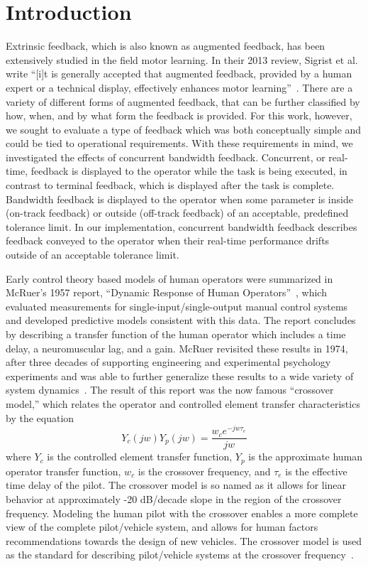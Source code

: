 \section{Introduction}
Extrinsic feedback, which is also known as augmented feedback, has been extensively studied in the field motor learning.
In their 2013 review, Sigrist et al. write ``[i]t is generally accepted that augmented feedback, provided by a human expert or a technical display, effectively enhances motor learning''~\cite{sigrist_augmented_2013}.
There are a variety of different forms of augmented feedback, that can be further classified by how, when, and by what form the feedback is provided.
For this work, however, we sought to evaluate a type of feedback which was both conceptually simple and could be tied to operational requirements.
With these requirements in mind, we investigated the effects of concurrent bandwidth feedback.
Concurrent, or real-time, feedback is displayed to the operator while the task is being executed, in contrast to terminal feedback, which is displayed after the task is complete.
Bandwidth feedback is displayed to the operator when some parameter is inside (on-track feedback) or outside (off-track feedback) of an acceptable, predefined tolerance limit.
In our implementation, concurrent bandwidth feedback describes feedback conveyed to the operator when their real-time performance drifts outside of an acceptable tolerance limit.

Early control theory based models of human operators were summarized in McRuer's 1957 report, ``Dynamic Response of Human Operators''~\cite{mcruer_dynamic_1957}, which evaluated measurements for single-input/single-output manual control systems and developed predictive models consistent with this data.
The report concludes by describing a transfer function of the human operator which includes a time delay, a neuromuscular lag, and a gain.
McRuer revisited these results in 1974, after three decades of supporting engineering and experimental psychology experiments and was able to further generalize these results to a wide variety of system dynamics~\cite{mcruer_mathematical_1974}.
The result of this report was the now famous ``crossover model,'' which relates the operator and controlled element transfer characteristics by the equation
\begin{equation}
    Y_c(jw) Y_p(jw) = \dfrac{w_c e^{-jw \tau_e}}{jw}
\end{equation}
where $Y_c$ is the controlled element transfer function, $Y_p$ is the approximate human operator transfer function, $w_c$ is the crossover frequency, and $\tau_e$ is the effective time delay of the pilot.
The crossover model is so named as it allows for linear behavior at approximately -20 dB/decade slope in the region of the crossover frequency.
Modeling the human pilot with the crossover enables a more complete view of the complete pilot/vehicle system, and allows for human factors recommendations towards the design of new vehicles.
The crossover model is used as the standard for describing pilot/vehicle systems at the crossover frequency~\cite{mcruer_mathematical_1974,mcruer_human_1965,xu_review_2017}.

